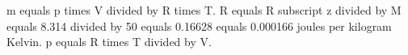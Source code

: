m equals p times V divided by R times T.  
R equals R subscript z divided by M equals 8.314 divided by 50 equals 0.16628 equals 0.000166 joules per kilogram Kelvin.  
p equals R times T divided by V.